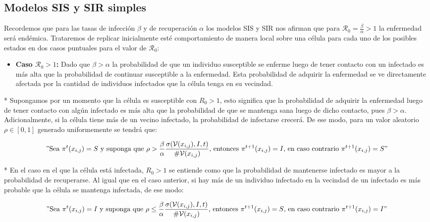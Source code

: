 \subsection{Modelos SIS y SIR simples}

Recordemos que para las tasas de infección $\beta$ y de recuperación $\alpha$ los modelos SIS y SIR nos afirman que para $\mathcal{R}_0=\frac{\beta}{\alpha}>1$ la enfermedad será endémica. Trataremos de replicar inicialmente esté comportamiento de manera local sobre una célula para cada uno de los posibles estados en dos casos puntuales para el valor de $\mathcal{R}_0$:

\begin{itemize}
    \item \textbf{Caso $\mathcal{R}_0>1$:} Dado que $\beta>\alpha$ la probabilidad de que un individuo susceptible se enferme luego de tener contacto con un infectado es más alta que la probabilidad de continuar susceptible a la enfermedad. Esta probabilidad de adquirir la enfermedad se ve directamente afectada por la cantidad de individuos infectados que la célula tenga en su vecindad.
\end{itemize}

* Supongamos por un momento que la célula es susceptible con $R_0>1$, esto significa que la probabilidad de adquirir la enfermedad luego de tener contacto con algún infectado es más alta que la probabilidad de que se mantenga sana luego de dicho contacto, pues $\beta>\alpha$. Adicionalmente, si la célula tiene más de un vecino infectado, la probabilidad de infectarse crecerá. De ese modo, para un valor aleatorio $\rho\in[0,1]$ generado uniformemente se tendrá que:

$$"\text{Sea }\pi^t(x_{i,j})=S\text{ y suponga que }\rho>\frac{\beta}{\alpha}\frac{\sigma(\mathcal{V}(x_{i,j}),I,t)}{\#\mathcal{V}(x_{i,j})}\text{, entonces }\pi^{t+1}(x_{i,j})=I\text{, en caso contrario }\pi^{t+1}(x_{i,j})=S"$$

* En el caso en el que la célula está infectada, $R_0>1$ se entiende como que la probabilidad de mantenerse infectado es mayor a la probabilidad de recuperarse. Al igual que en el caso anterior, si hay más de un individuo infectado en la vecindad de un infectado es más probable que la célula se mantenga infectada, de ese modo:

$$"\text{Sea }\pi^t(x_{i,j})=I\text{ y suponga que }\rho\leq\frac{\beta}{\alpha}\frac{\sigma(\mathcal{V}(x_{i,j}),I,t)}{\#\mathcal{V}(x_{i,j})}\text{, entonces }\pi^{t+1}(x_{i,j})=S\text{, en caso contrario }\pi^{t+1}(x_{i,j})=I"$$

